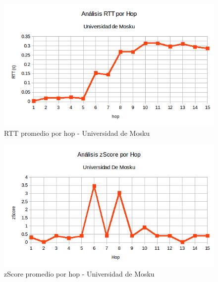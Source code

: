 \begin{figure}[H]
\centering
\includegraphics[width=1\textwidth]{graficos/RTT_rus.png}
\caption{RTT promedio por hop - Universidad de Mosku}
\label{Rus_rtt}
\end{figure}

\begin{figure}[H]
\centering
\includegraphics[width=1\textwidth]{graficos/zScore_rus.png}
\caption{zScore promedio por hop - Universidad de Mosku}
\label{Rus_zs}
\end{figure}
